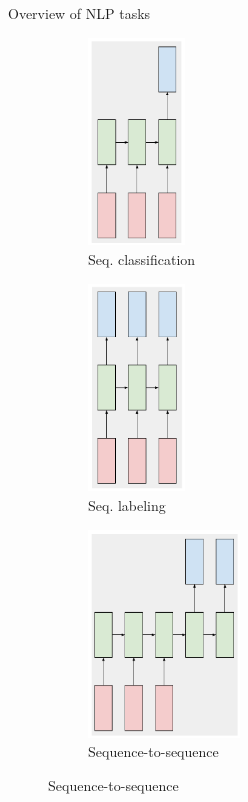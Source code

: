\documentclass[12pt,aspectratio=169,handout]{beamer}
\begin{document}
\begin{frame}{Overview of NLP tasks}

	\begin{figure}
		\centering
		\begin{subfigure}[b]{0.28\textwidth}
			\centering
			\includegraphics[height=5.5cm]{sequence_classification.pdf}
			\caption{Seq. classification}
			\label{fig:seqclf}
		\end{subfigure}
		\hfill
		\begin{subfigure}[b]{0.28\textwidth}
			\centering
			\includegraphics[height=5.5cm]{sequence_labeling.pdf}
			\caption{Seq. labeling}
			\label{fig:seqlab}
		\end{subfigure}
		\hfill
		\begin{subfigure}[b]{0.4\textwidth}
			\centering
			\includegraphics[height=5.5cm]{seq2seq.pdf}
			\caption{Sequence-to-sequence}
			\label{fig:seq2seq}
		\end{subfigure}
   \end{figure}
   
\end{frame}
\end{document}
